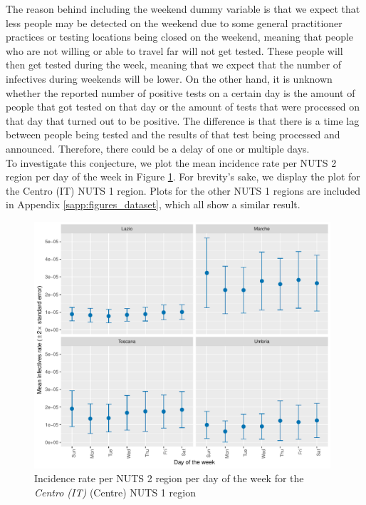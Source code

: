 \documentclass[12pt]{article}
\begin{document}
	The reason behind including the weekend dummy variable is that we expect that less people may be detected on the weekend due to some general practitioner practices or testing locations being closed on the weekend, meaning that people who are not willing or able to travel far will not get tested. These people will then get tested during the week, meaning that we expect that the number of infectives during weekends will be lower. On the other hand, it is unknown whether the reported number of positive tests on a certain day is the amount of people that got tested on that day or the amount of tests that were processed on that day that turned out to be positive. The difference is that there is a time lag between people being tested and the results of that test being processed and announced. Therefore, there could be a delay of one or multiple days. \\
	
	To investigate this conjecture, we plot the mean incidence rate per NUTS 2 region per day of the week in Figure \ref{fig:incidence_Centro_weekday}. For brevity's sake, we display the plot for the Centro (IT) NUTS 1 region. Plots for the other NUTS 1 regions are included in Appendix \ref{sapp:figures_dataset}, which all show a similar result. \\
	
	\begin{figure}[ht]
	    \centering
	    \includegraphics[width=0.98\textwidth]{output/infective_rates_weekday_Centro (IT).pdf}
	    \caption{Incidence rate per NUTS 2 region per day of the week for the \textit{Centro (IT)} (Centre) NUTS 1 region}
	    \label{fig:incidence_Centro_weekday}
	\end{figure}
	
\end{document}
